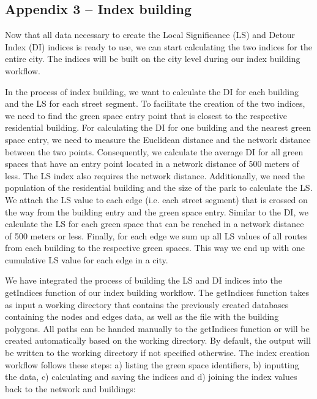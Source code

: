 \documentclass[10pt]{article}
\begin{document}
\subsection{Appendix 3 – Index building}

Now that all data necessary to create the Local Significance (LS) and Detour Index (DI) indices is ready to use, we can start calculating the two indices for the entire city.
The indices will be built on the city level during our index building workflow.

In the process of index building, we want to calculate the DI for each building and the LS for each street segment.
To facilitate the creation of the two indices, we need to find the green space entry point that is closest to the respective residential building.
For calculating the DI for one building and the nearest green space entry, we need to measure the Euclidean distance and the network distance between the two points.
Consequently, we calculate the average DI for all green spaces that have an entry point located in a network distance of 500 meters of less.
The LS index also requires the network distance.
Additionally, we need the population of the residential building and the size of the park to calculate the LS.
We attach the LS value to each edge (i.e. each street segment) that is crossed on the way from the building entry and the green space entry. 
Similar to the DI, we calculate the LS for each green space that can be reached in a network distance of 500 meters or less.
Finally, for each edge we sum up all LS values of all routes from each building to the respective green spaces.
This way we end up with one cumulative LS value for each edge in a city.

We have integrated the process of building the LS and DI indices into the getIndices function of our index building workflow.
The getIndices function takes as input a working directory that contains the previously created databases containing the nodes and edges data, as well as the file with the building polygons.
All paths can be handed manually to the getIndices function or will be created automatically based on the working directory.
By default, the output will be written to the working directory if not specified otherwise.
The index creation workflow follows these steps: a) listing the green space identifiers, b) inputting the data, c) calculating and saving the indices and d) joining the index values back to the network and buildings:
\end{document}
